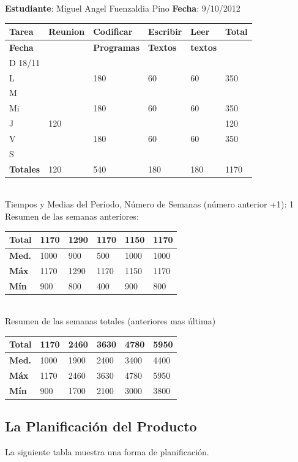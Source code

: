 \documentclass[a4paper,12pt,openany,oneside]{book}
\begin{document}
\textbf{Estudiante}: Miguel Angel Fuenzaldia Pino     \textbf{Fecha}: 9/10/2012\\
\begin{tabular}{| l | l | l | l | l | l |}
\hline
\textbf{Tarea} & \textbf{Reunion} & \textbf{Codificar} & \textbf{Escribir} & \textbf{Leer} & \textbf{Total} \\
\hline
\textbf{Fecha} &                  & \textbf{Programas} & \textbf{Textos} & \textbf{textos} & \\
\hline
D 18/11 & & & & & \\
\hline
L & & 180 & 60 & 60 & 350\\
\hline
M & & & & & \\
\hline
Mi & & 180 & 60 & 60 & 350\\
\hline
J & 120 & & & & 120\\
\hline
V & & 180 & 60 & 60 & 350\\
\hline
S & & & & & \\
\hline
\textbf{Totales} & 120 & 540 & 180 & 180 & 1170\\
\hline
\end{tabular}
\\
Tiempos y Medias del Período, Número de Semanas (número anterior +1): 1\\
Resumen de las semanas anteriores:\\
\begin{tabular}{| l | l | l | l | l | l |}
\hline
\textbf{Total} & 1170 & 1290 & 1170 & 1150 & 1170 \\
\hline
\textbf{Med.} & 1000 & 900 & 500 & 1000 & 1000 \\
\hline
\textbf{Máx} & 1170 & 1290 & 1170 & 1150 & 1170 \\
\hline
\textbf{Mín} & 900 & 800 & 400 & 900 & 800 \\
\hline
\end{tabular}
\\
Resumen de las semanas totales (anteriores mas última)\\
\begin{tabular}{| l | l | l | l | l | l |}
\hline
\textbf{Total} & 1170 & 2460 & 3630 & 4780 & 5950 \\
\hline
\textbf{Med.} & 1000 & 1900 & 2400 & 3400 & 4400 \\
\hline
\textbf{Máx} & 1170 & 2460 & 3630 & 4780 & 5950 \\
\hline
\textbf{Mín} & 900 & 1700 & 2100 & 3000 & 3800 \\
\hline
\end{tabular}
\subsection{La Planificación del Producto}
La siguiente tabla muestra una forma de planificación.
\end{document}
